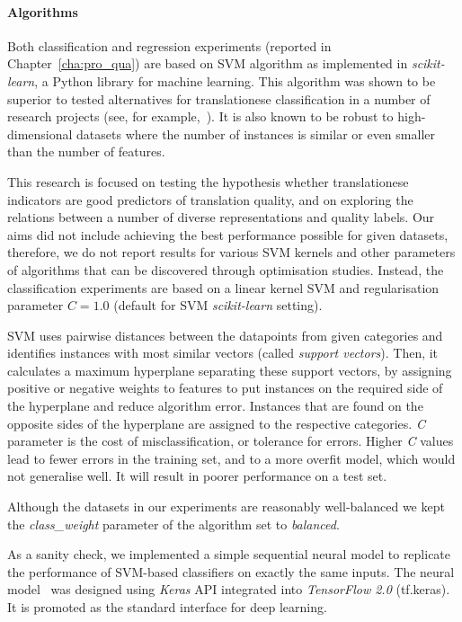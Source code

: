 \paragraph{Algorithms} Both classification and regression experiments (reported in Chapter~\ref{cha:pro_qua}) are based on \gls{SVM} algorithm as implemented in \textit{scikit-learn}, a Python library for machine learning. 
This algorithm was shown to be superior to tested alternatives for translationese classification in a number of research projects (see, for example,~\cite{Ilisei2010}). It is also known to be robust to high-dimensional datasets where the number of instances is similar or even smaller than the number of features.

This research is focused on testing the hypothesis whether translationese indicators are good predictors of translation quality, and on exploring the relations between a number of diverse representations and quality labels. Our aims did not include achieving the best performance possible for given datasets, therefore, we do not report results for various SVM kernels and other parameters of algorithms that can be discovered through optimisation studies. 
Instead, the classification experiments are based on a linear kernel SVM and regularisation parameter $C=1.0$ (default for SVM \textit{scikit-learn} setting).

SVM uses pairwise distances between the datapoints from given categories and identifies instances with most similar vectors (called \textit{support vectors}). Then, it calculates a maximum hyperplane separating these support vectors, by assigning positive or negative weights to features to put instances on the required side of the hyperplane and reduce algorithm error. Instances that are found on the opposite sides of the hyperplane are assigned to the respective categories. 
\textit{C} parameter is the cost of misclassification, or tolerance for errors. Higher \textit{C} values lead to fewer errors in the training set, and to a more overfit model, which would not generalise well. It will result in poorer performance on a test set.

Although the datasets in our experiments are reasonably well-balanced we kept the \textit{class\_weight} parameter of the algorithm set to \textit{balanced}. 

As a sanity check, we implemented a simple sequential neural model to replicate the performance of SVM-based classifiers on exactly the same inputs. The neural model~\label{pg:neural} was designed using \textit{Keras} \gls{API} integrated into \textit{TensorFlow 2.0} (tf.keras). It is promoted as the standard interface for deep learning.  

